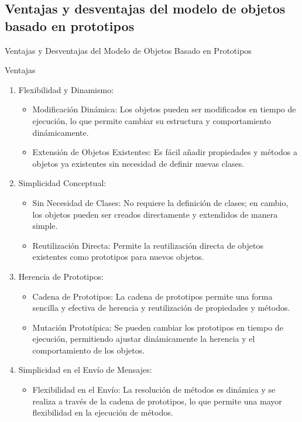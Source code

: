 \documentclass{article}
\begin{document}
\subsection{Ventajas y desventajas del modelo de objetos basado en prototipos }

Ventajas y Desventajas del Modelo de Objetos Basado en Prototipos

Ventajas

\begin{enumerate}
    \item Flexibilidad y Dinamismo:
          \begin{itemize}
              \item Modificación Dinámica: Los objetos pueden ser modificados en tiempo de ejecución, lo que permite
                    cambiar su estructura y comportamiento dinámicamente.
              \item Extensión de Objetos Existentes: Es fácil añadir propiedades y métodos a objetos ya existentes sin
                    necesidad de definir nuevas clases.
          \end{itemize}
    \item Simplicidad Conceptual:
          \begin{itemize}
              \item Sin Necesidad de Clases: No requiere la definición de clases; en cambio, los objetos pueden ser
                    creados directamente y extendidos de manera simple.
              \item Reutilización Directa: Permite la reutilización directa de objetos existentes como prototipos
                    para nuevos objetos.
          \end{itemize}
    \item Herencia de Prototipos:
          \begin{itemize}
              \item Cadena de Prototipos: La cadena de prototipos permite una forma sencilla y efectiva de herencia y
                    reutilización de propiedades y métodos.
              \item Mutación Prototípica: Se pueden cambiar los prototipos en tiempo de ejecución, permitiendo ajustar
                    dinámicamente la herencia y el comportamiento de los objetos.
          \end{itemize}
    \item Simplicidad en el Envío de Mensajes:
          \begin{itemize}
              \item Flexibilidad en el Envío: La resolución de métodos es dinámica y se realiza a través de la cadena
                    de prototipos, lo que permite una mayor flexibilidad en la ejecución de métodos.
          \end{itemize}
\end{enumerate}
\end{document}
